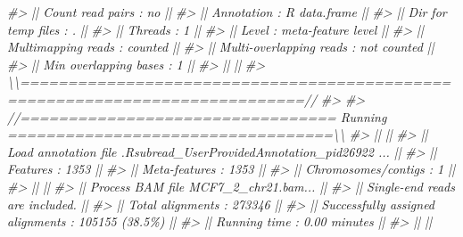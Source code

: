 \documentclass[
]{article}
\newenvironment{Shaded}{\begin{snugshade}}{\end{snugshade}}
\newcommand{\CommentTok}[1]{\textcolor[rgb]{0.56,0.35,0.01}{\textit{#1}}}
\begin{document}
\begin{Shaded}
\begin{Highlighting}[]
\CommentTok{\#\textgreater{} ||        Count read pairs : no                                               ||}
\CommentTok{\#\textgreater{} ||              Annotation : R data.frame                                     ||}
\CommentTok{\#\textgreater{} ||      Dir for temp files : .                                                ||}
\CommentTok{\#\textgreater{} ||                 Threads : 1                                                ||}
\CommentTok{\#\textgreater{} ||                   Level : meta{-}feature level                               ||}
\CommentTok{\#\textgreater{} ||      Multimapping reads : counted                                          ||}
\CommentTok{\#\textgreater{} || Multi{-}overlapping reads : not counted                                      ||}
\CommentTok{\#\textgreater{} ||   Min overlapping bases : 1                                                ||}
\CommentTok{\#\textgreater{} ||                                                                            ||}
\CommentTok{\#\textgreater{} \textbackslash{}\textbackslash{}============================================================================//}
\CommentTok{\#\textgreater{} }
\CommentTok{\#\textgreater{} //================================= Running ==================================\textbackslash{}\textbackslash{}}
\CommentTok{\#\textgreater{} ||                                                                            ||}
\CommentTok{\#\textgreater{} || Load annotation file .Rsubread\_UserProvidedAnnotation\_pid26922 ...         ||}
\CommentTok{\#\textgreater{} ||    Features : 1353                                                         ||}
\CommentTok{\#\textgreater{} ||    Meta{-}features : 1353                                                    ||}
\CommentTok{\#\textgreater{} ||    Chromosomes/contigs : 1                                                 ||}
\CommentTok{\#\textgreater{} ||                                                                            ||}
\CommentTok{\#\textgreater{} || Process BAM file MCF7\_2\_chr21.bam...                                       ||}
\CommentTok{\#\textgreater{} ||    Single{-}end reads are included.                                          ||}
\CommentTok{\#\textgreater{} ||    Total alignments : 273346                                               ||}
\CommentTok{\#\textgreater{} ||    Successfully assigned alignments : 105155 (38.5\%)                       ||}
\CommentTok{\#\textgreater{} ||    Running time : 0.00 minutes                                             ||}
\CommentTok{\#\textgreater{} ||                                                                            ||}

\end{Highlighting}
\end{Shaded}
\end{document}
